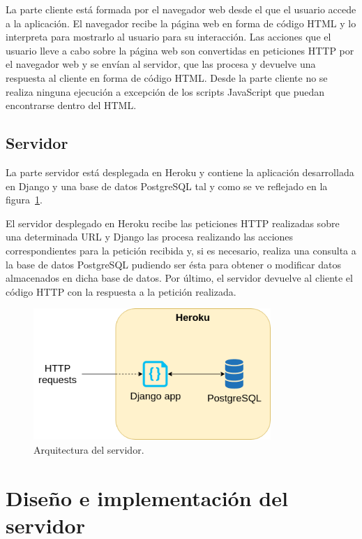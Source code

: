 \documentclass[a4paper, 12pt]{book}
\begin{document}
La parte cliente está formada por el navegador web desde el que el usuario accede a la aplicación. 
El navegador recibe la página web en forma de código HTML y lo interpreta para mostrarlo al usuario para su interacción.
Las acciones que el usuario lleve a cabo sobre la página web son convertidas en peticiones HTTP por el navegador web y se envían al servidor, que las procesa y devuelve una respuesta al cliente en forma de código HTML.
Desde la parte cliente no se realiza ninguna ejecución a excepción de los scripts JavaScript que puedan encontrarse dentro del HTML.

\subsection{Servidor}
\label{subsec:arq_servidor}

La parte servidor está desplegada en Heroku y contiene la aplicación desarrollada en Django y una base de datos PostgreSQL tal y como se ve reflejado en la figura~\ref{fig:servidor}.

El servidor desplegado en Heroku recibe las peticiones HTTP realizadas sobre una determinada URL y Django las procesa realizando las acciones correspondientes para la petición recibida y, si es necesario, realiza una consulta a la base de datos PostgreSQL pudiendo ser ésta para obtener o modificar datos almacenados en dicha base de datos.
Por último, el servidor devuelve al cliente el código HTTP con la respuesta a la petición realizada.
\newline
\begin{figure}[h]
  \centering
  \includegraphics[width=9cm, keepaspectratio]{img/servidor.png}
  \caption{Arquitectura del servidor.}\label{fig:servidor}
\end{figure}

\section{Diseño e implementación del servidor} 
\label{sec:diseno_servidor}
\end{document}
